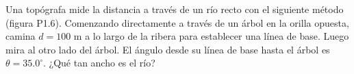 \item Una topógrafa mide la distancia a través de un río recto con el siguiente método (figura P1.6). Comenzando directamente a través de un árbol en la orilla opuesta, camina $d = 100 \text{ m}$ a lo largo de la ribera para establecer una línea de base. Luego mira al otro lado del árbol. El ángulo desde su línea de base hasta el árbol es $\theta = 35.0^\circ$. ¿Qué tan ancho es el río?
